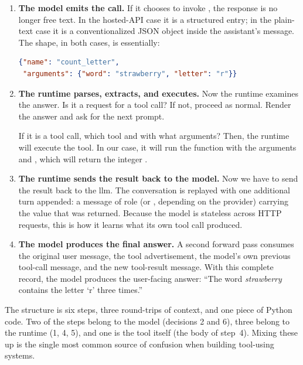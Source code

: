 \begin{enumerate}[label=\textbf{Step \arabic*.},leftmargin=2.3em,itemsep=0.4em]
  \item \textbf{The model emits the call.} If it chooses to invoke
  , the response is no longer free text. In the
  hosted-API case it is a structured  entry; in the
  plain-text case it is a conventionalized JSON object inside the
  assistant's message. The shape, in both cases, is essentially:

\begin{lstlisting}[language=json]
{"name": "count_letter",
 "arguments": {"word": "strawberry", "letter": "r"}}
\end{lstlisting}

\item \textbf{The runtime parses, extracts, and executes.} 
 Now the runtime examines the answer. Is it a request for a tool call? If not,
 proceed as normal. Render the answer and ask for the next prompt. 
 
 If it is a tool call, which tool and with what arguments? Then, the runtime
 will execute the tool. In our case, it will run the  
 function with the arguments  and , 
 which will return the integer .

\item \textbf{The runtime sends the result back to the model.} Now we 
have to send the result back to the llm. The
  conversation is replayed with one additional turn appended: a
  message of role  (or , depending on
  the provider) carrying the value that was returned. Because the
  model is stateless across HTTP requests, this is how it learns
  what its own tool call produced.

\item \textbf{The model produces the final answer.} A second forward
  pass consumes the original user message, the tool advertisement,
  the model's own previous tool-call message, and the new tool-result
  message. With this complete record, the model produces the
  user-facing answer: ``The word \emph{strawberry} contains the
  letter `r' three times.''

\end{enumerate}

\noindent
The structure is six steps, three round-trips of context, and one
piece of Python code. Two of the steps belong to the model
(decisions 2 and 6), three belong to the runtime (1, 4, 5), and one
is the tool itself (the body of step~4). Mixing these up is the
single most common source of confusion when building tool-using
systems.

